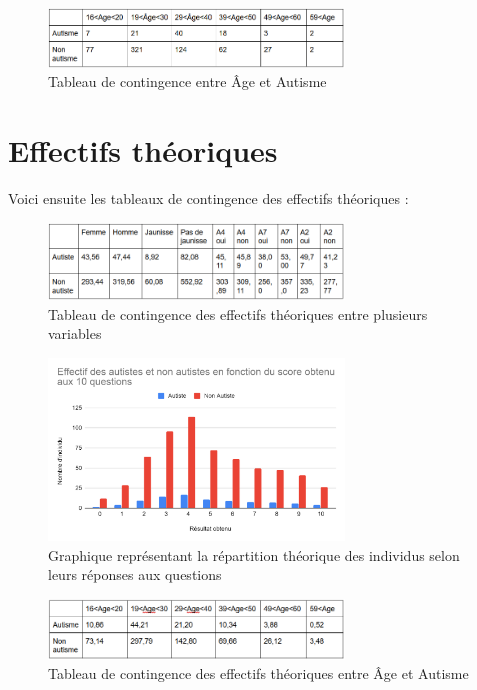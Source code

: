 \documentclass[12,french]{report}
\begin{document}
\begin{figure}[H]
	\center
	\includegraphics[width=0.7\textwidth]{./Images/26}
	\caption{Tableau de contingence entre Âge et Autisme}
\end{figure}\vspace{0.6cm}

\section{Effectifs théoriques}
Voici ensuite les tableaux de contingence des effectifs théoriques :\\

\begin{figure}[H]
	\center
	\includegraphics[width=0.7\textwidth]{./Images/27}
	\caption{Tableau de contingence des effectifs théoriques entre plusieurs variables}
\end{figure}\vspace{0.1cm}

\begin{figure}[H]
	\center
	\includegraphics[width=0.7\textwidth]{./Images/28}
	\caption{Graphique représentant la répartition théorique des individus selon leurs réponses aux questions}
\end{figure}\vspace{0.1cm}

\begin{figure}[H]
	\center
	\includegraphics[width=0.7\textwidth]{./Images/29}
	\caption{Tableau de contingence des effectifs théoriques entre Âge et 			Autisme}
\end{figure}\vspace{0.1cm}
\end{document}
